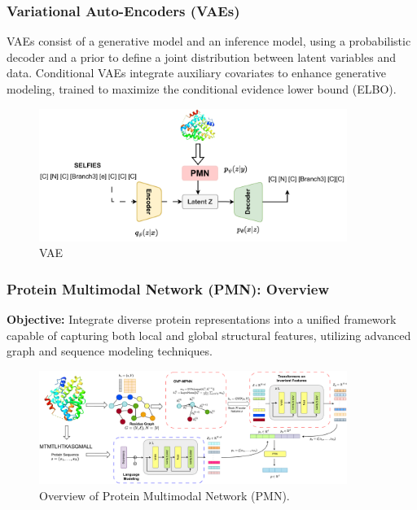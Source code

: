 \documentclass[11pt,xcolor={dvipsnames},hyperref={pdftex,pdfpagemode=UseNone,hidelinks,pdfdisplaydoctitle=true},usepdftitle=false]{beamer}
\begin{document}
\begin{frame}
    \frametitle{Variational Auto-Encoders (VAEs)}
    VAEs consist of a generative model and an inference model, using a probabilistic decoder and a prior to define a joint distribution between latent variables and data. Conditional VAEs integrate auxiliary covariates to enhance generative modeling, trained to maximize the conditional evidence lower bound (ELBO).
    
    \begin{figure}[t]
        \centering
        \includegraphics[width = 10cm]{./media/_vae_4_protein/target_vae.pdf}
        \caption{VAE}
    \end{figure}
\end{frame}
    

\begin{frame}
    \frametitle{Protein Multimodal Network (PMN): Overview}
    \textbf{Objective:} Integrate diverse protein representations into a unified framework capable of capturing both local and global structural features, utilizing advanced graph and sequence modeling techniques.
    
    
    \begin{figure}[t]
        \centering
        \includegraphics[width = 10cm]{./media/_vae_4_protein/pmn.pdf}
        \caption{Overview of Protein Multimodal Network (PMN).}
    \end{figure}
\end{frame}
\end{document}
